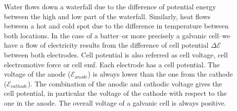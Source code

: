 \documentclass[main.tex]{subfiles}
\begin{document}
\begin{description}
\item[]
Water flows down a waterfall due to the difference of potential energy between the high and low part of the waterfall. Similarly, heat flows between a hot and cold spot due to the difference in temperature between both locations. In the case of a batter--or more precisely a galvanic cell--we have a flow of electricity results from the difference of cell potential $\Delta \mathcal{E}$ between both electrodes. Cell potential is also referred as cell voltage, cell electromotive force or cell emf. Each electrode has a cell potential. The voltage of the anode ($\mathcal{E}_{anode}$) is always lower than the one from the cathode  ($\mathcal{E}_{cathode}$). The combination of the anodic and cathodic voltage gives the cell potential, in particular the voltage of the cathode with respect to the one in the anode. The overall voltage of a galvanic cell is always positive.
\end{description}
\end{document}

